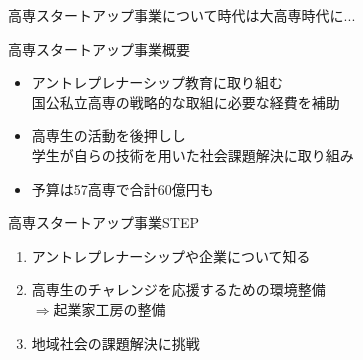 \documentclass[dvipdfmx]{beamer}
\begin{document}
\begin{frame}{高専スタートアップ事業について}{時代は大高専時代に...}

  \begin{alertblock}{高専スタートアップ事業概要}
      \begin{itemize}
        \setlength{\itemsep}{1mm}
        \item アントレプレナーシップ教育に取り組む\\
        国公私立高専の戦略的な取組に必要な経費を補助
        \item 高専生の活動を後押しし\\
        学生が自らの技術を用いた社会課題解決に取り組み
        \item 予算は57高専で合計\alert{60億円}も
      \end{itemize}
  \end{alertblock}

  \vspace{-3mm}

  \begin{center}
  \end{center}

  \vspace{-4.5mm}

  \begin{greyblock}{高専スタートアップ事業STEP}
    \begin{enumerate}
      \setlength{\itemsep}{1mm}
      \item アントレプレナーシップや企業について知る
      \item 高専生のチャレンジを応援するための環境整備\\
      $\Rightarrow$\alert{起業家工房}の整備
      \item 地域社会の課題解決に挑戦
    \end{enumerate}
  \end{greyblock}
\end{frame}
\end{document}
